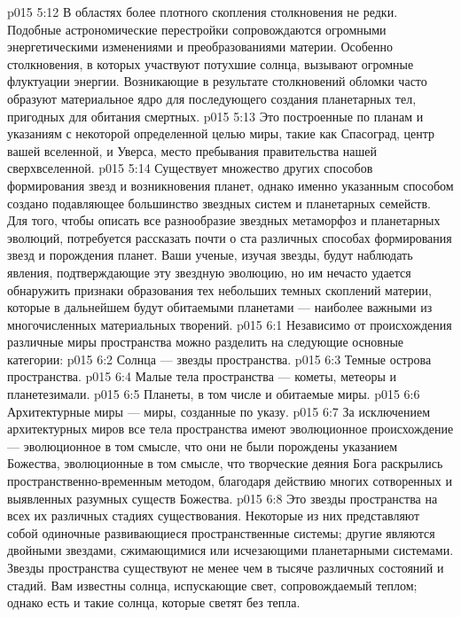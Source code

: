 \vs p015 5:12 \pc {}\bibnobreakspace {} В областях более плотного скопления столкновения не редки. Подобные астрономические перестройки сопровождаются огромными энергетическими изменениями и преобразованиями материи. Особенно столкновения, в которых участвуют потухшие солнца, вызывают огромные флуктуации энергии. Возникающие в результате столкновений обломки часто образуют материальное ядро для последующего создания планетарных тел, пригодных для обитания смертных.
\vs p015 5:13 \pc {}\bibnobreakspace {} Это построенные по планам и указаниям с некоторой определенной целью миры, такие как Спасоград, центр вашей вселенной, и Уверса, место пребывания правительства нашей сверхвселенной.
\vs p015 5:14 \pc Существует множество других способов формирования звезд и возникновения планет, однако именно указанным способом создано подавляющее большинство звездных систем и планетарных семейств. Для того, чтобы описать все разнообразие звездных метаморфоз и планетарных эволюций, потребуется рассказать почти о ста различных способах формирования звезд и порождения планет. Ваши ученые, изучая звезды, будут наблюдать явления, подтверждающие эту звездную эволюцию, но им нечасто удается обнаружить признаки образования тех небольших темных скоплений материи, которые в дальнейшем будут обитаемыми планетами --- наиболее важными из многочисленных материальных творений.
\vs p015 6:1 Независимо от происхождения различные миры пространства можно разделить на следующие основные категории:
\vs p015 6:2 \bibnobreakspace Солнца --- звезды пространства.
\vs p015 6:3 \bibnobreakspace Темные острова пространства.
\vs p015 6:4 \bibnobreakspace Малые тела пространства --- кометы, метеоры и планетезимали.
\vs p015 6:5 \bibnobreakspace Планеты, в том числе и обитаемые миры.
\vs p015 6:6 \bibnobreakspace Архитектурные миры --- миры, созданные по указу.
\vs p015 6:7 \pc За исключением архитектурных миров все тела пространства имеют эволюционное происхождение --- эволюционное в том смысле, что они не были порождены указанием Божества, эволюционные в том смысле, что творческие деяния Бога раскрылись пространственно\hyp{}временным методом, благодаря действию многих сотворенных и выявленных разумных существ Божества.
\vs p015 6:8 \pc {} Это звезды пространства на всех их различных стадиях существования. Некоторые из них представляют собой одиночные развивающиеся пространственные системы; другие являются двойными звездами, сжимающимися или исчезающими планетарными системами. Звезды пространства существуют не менее чем в тысяче различных состояний и стадий. Вам известны солнца, испускающие свет, сопровождаемый теплом; однако есть и такие солнца, которые светят без тепла.

